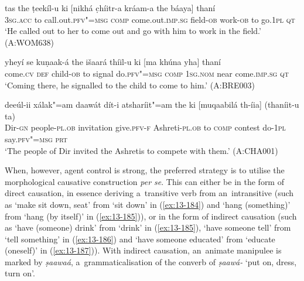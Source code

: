 \begin{exe}
\ex
\label{ex:13-181}
\gll tas the ṭeekíl-u ki [nikhá c̣híitr-a  kráam-a the báaya] thaní \\
\textsc{3sg.acc} to call.out.\textsc{pfv"=msg} \textsc{comp} come.out.\textsc{imp.sg} field-\textsc{ob}  work-\textsc{ob} to go.\textsc{1pl} \textsc{qt} \\
\glt `He called out to her to come out and go with him to work in the field.' (A:WOM638)

\ex
\label{ex:13-182}
\gll yheyí se kuṇaak-á the išaará thíil-u  ki [ma khúna yha] thaní \\
come.\textsc{cv} \textsc{def} child-\textsc{ob} to signal do.\textsc{pfv"=msg} \textsc{comp} \textsc{1sg.nom} near come.\textsc{imp.sg} \textsc{qt} \\
\glt `Coming there, he signalled to the child to come to him.' (A:BRE003)

\ex
\label{ex:13-183}
\gll deeúl-ii xálak"=am daawát dít-i  atsharíit"=am the ki [muqaabilá
  th-íia]  (thaníit-u ta) \\
Dir-\textsc{gn}  people-\textsc{pl.ob} invitation give.\textsc{pfv-f} Ashreti-\textsc{pl.ob} to \textsc{comp} contest do-\textsc{1pl} say.\textsc{pfv"=msg} \textsc{prt} \\
\glt `The people of Dir invited the Ashretis to compete with them.' (A:CHA001) 
\end{exe}

When, however, agent control is strong, the preferred strategy is to utilise the morphological causative construction \textit{per se}. This can either be in the form of direct causation, in essence deriving a~transitive verb from an~intransitive (such as `make sit down, seat' from `sit down' in (\ref{ex:13-184}) and `hang (something)' from `hang (by itself)' in (\ref{ex:13-185})), or in the form of indirect causation (such as `have (someone) drink' from `drink' in (\ref{ex:13-185}), `have someone tell' from `tell something' in (\ref{ex:13-186}) and `have someone educated' from `educate (oneself)' in (\ref{ex:13-187})). With indirect causation, an~animate manipulee is marked by \textit{ṣaawaá}, a~grammaticalisation of the converb of \textit{ṣaawá-} `put on, dress, turn on'.

